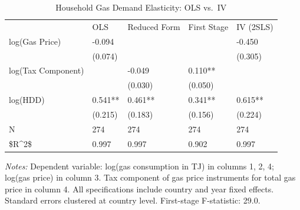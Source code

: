 \begin{table}[htbp]
\centering
\caption{Household Gas Demand Elasticity: OLS vs.\ IV\label{tab:iv}}
\begin{tabular}{lllll}
& OLS & Reduced Form & First Stage & IV (2SLS) \\
log(Gas Price) & -0.094 &  &  & -0.450 \\
& (0.074) &  &  & (0.305) \\
log(Tax Component) &  & -0.049 & 0.110** &  \\
&  & (0.030) & (0.050) &  \\
log(HDD) & 0.541** & 0.461** & 0.341** & 0.615** \\
& (0.215) & (0.183) & (0.156) & (0.224) \\
N & 274 & 274 & 274 & 274 \\
\$R\textasciicircum{}2\$ & 0.997 & 0.997 & 0.902 & 0.997 \\
\end{tabular}
\begin{minipage}{0.95\textwidth}
\vspace{0.3em}
\footnotesize \textit{Notes:} Dependent variable: log(gas consumption in TJ) in columns 1, 2, 4; log(gas price) in column 3. Tax component of gas price instruments for total gas price in column 4. All specifications include country and year fixed effects. Standard errors clustered at country level. First-stage F-statistic: 29.0.
\end{minipage}
\end{table}


